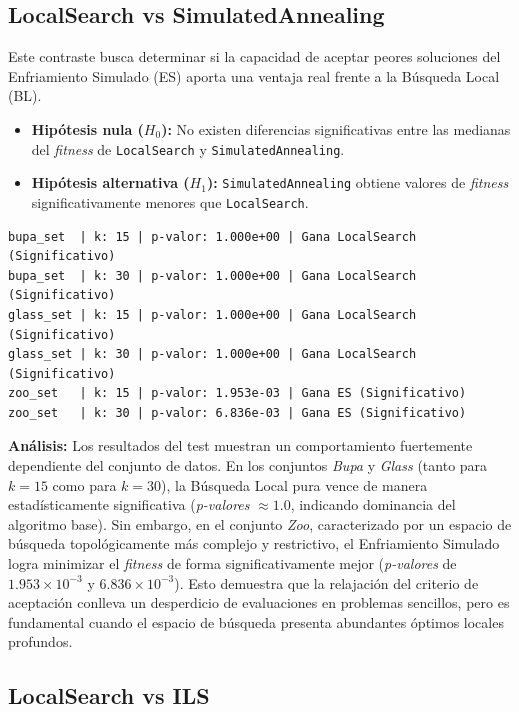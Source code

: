 \documentclass[a4paper,12pt]{article}%
\begin{document}
\subsection*{LocalSearch vs SimulatedAnnealing}

Este contraste busca determinar si la capacidad de aceptar peores soluciones del Enfriamiento Simulado (ES) aporta una ventaja real frente a la Búsqueda Local (BL).
\begin{itemize}
	\item \textbf{Hipótesis nula ($H_0$):} No existen diferencias significativas entre las medianas del \textit{fitness} de \texttt{LocalSearch} y \texttt{SimulatedAnnealing}.
	\item \textbf{Hipótesis alternativa ($H_1$):} \texttt{SimulatedAnnealing} obtiene valores de \textit{fitness} significativamente menores que \texttt{LocalSearch}.
\end{itemize}

{\footnotesize
\begin{verbatim}
bupa_set  | k: 15 | p-valor: 1.000e+00 | Gana LocalSearch (Significativo)
bupa_set  | k: 30 | p-valor: 1.000e+00 | Gana LocalSearch (Significativo)
glass_set | k: 15 | p-valor: 1.000e+00 | Gana LocalSearch (Significativo)
glass_set | k: 30 | p-valor: 1.000e+00 | Gana LocalSearch (Significativo)
zoo_set   | k: 15 | p-valor: 1.953e-03 | Gana ES (Significativo)
zoo_set   | k: 30 | p-valor: 6.836e-03 | Gana ES (Significativo)
\end{verbatim}
}

\noindent \textbf{Análisis:} Los resultados del test muestran un comportamiento fuertemente dependiente del conjunto de datos. En los conjuntos \textit{Bupa} y \textit{Glass} (tanto para $k=15$ como para $k=30$), la Búsqueda Local pura vence de manera estadísticamente significativa (\textit{p-valores} $\approx 1.0$, indicando dominancia del algoritmo base). Sin embargo, en el conjunto \textit{Zoo}, caracterizado por un espacio de búsqueda topológicamente más complejo y restrictivo, el Enfriamiento Simulado logra minimizar el \textit{fitness} de forma significativamente mejor (\textit{p-valores} de $1.953 \times 10^{-3}$ y $6.836 \times 10^{-3}$). Esto demuestra que la relajación del criterio de aceptación conlleva un desperdicio de evaluaciones en problemas sencillos, pero es fundamental cuando el espacio de búsqueda presenta abundantes óptimos locales profundos.


\subsection*{LocalSearch vs ILS}
\end{document}

